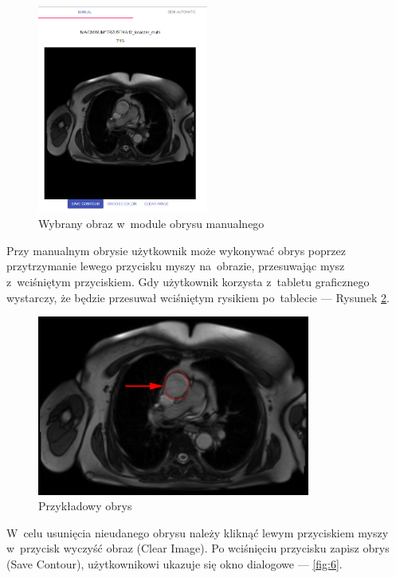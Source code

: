 \documentclass[a4paper,11pt,twoside,openright]{report}
\theoremstyle{definition}
\begin{document}
\pagebreak

\begin{figure}[h!]
	\center
	\includegraphics[width=0.5\textwidth]{4}
	\caption{Wybrany obraz w~module obrysu manualnego}
    	\label{fig:4}
\end{figure}

Przy manualnym obrysie użytkownik może wykonywać obrys poprzez przytrzymanie
lewego przycisku myszy na~obrazie, przesuwając mysz z~wciśniętym przyciskiem.
Gdy użytkownik korzysta z~tabletu graficznego wystarczy, że będzie przesuwał
wciśniętym rysikiem po~tablecie --- Rysunek \ref{fig:5}.

\begin{figure}[h!]
	\center
	\includegraphics[width=0.8\textwidth]{5}
	\caption{Przykładowy obrys}
    	\label{fig:5}
\end{figure}

\pagebreak

W~celu usunięcia nieudanego obrysu należy kliknąć lewym przyciskiem
myszy w~przycisk wyczyść obraz (Clear Image). Po wciśnięciu przycisku zapisz obrys
(Save Contour), użytkownikowi ukazuje się okno dialogowe --- \ref{fig:6}.
\end{document}
